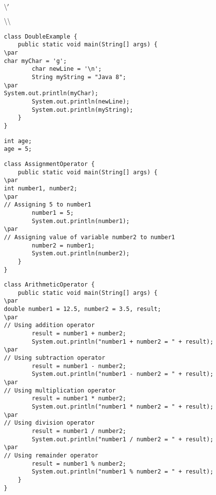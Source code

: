 \documentclass{book}
\def\lthtmlcheckvsize{\ifdim\ht\sizebox<\vsize 
  \ifdim\wd\sizebox<\hsize\expandafter\hfill\fi \expandafter\vfill
  \else\expandafter\vss\fi}%
\begin{document}
{\newpage\clearpage
{}%
$\symbol{92}'$%
\lthtmlindisplaymathZ
\lthtmlcheckvsize\clearpage}

{\newpage\clearpage
{}%
$\symbol{92}\symbol{92}$%
\lthtmlindisplaymathZ
\lthtmlcheckvsize\clearpage}

{\newpage\clearpage
{}%
\begin{lstlisting}
class DoubleExample {
    public static void main(String[] args) {
\par
char myChar = 'g';
        char newLine = '\n';
        String myString = "Java 8";
\par
System.out.println(myChar);
        System.out.println(newLine);
        System.out.println(myString);
    }
}
\end{lstlisting}%
\lthtmlfigureZ
\lthtmlcheckvsize\clearpage}

{\newpage\clearpage
{}%
\begin{lstlisting}
int age;
age = 5;
\end{lstlisting}%
\lthtmlfigureZ
\lthtmlcheckvsize\clearpage}

{\newpage\clearpage
{}%
\begin{lstlisting}
class AssignmentOperator {
    public static void main(String[] args) {
\par
int number1, number2;
\par
// Assigning 5 to number1 
        number1 = 5;
        System.out.println(number1);
\par
// Assigning value of variable number2 to number1
        number2 = number1;
        System.out.println(number2);
    }
}
\end{lstlisting}%
\lthtmlfigureZ
\lthtmlcheckvsize\clearpage}

{\newpage\clearpage
{}%
\begin{lstlisting}
class ArithmeticOperator {
    public static void main(String[] args) {
\par
double number1 = 12.5, number2 = 3.5, result;
\par
// Using addition operator
        result = number1 + number2;
        System.out.println("number1 + number2 = " + result);
\par
// Using subtraction operator
        result = number1 - number2;
        System.out.println("number1 - number2 = " + result);
\par
// Using multiplication operator
        result = number1 * number2;
        System.out.println("number1 * number2 = " + result);
\par
// Using division operator
        result = number1 / number2;
        System.out.println("number1 / number2 = " + result);
\par
// Using remainder operator
        result = number1 % number2;
        System.out.println("number1 % number2 = " + result);
    }
}
\end{lstlisting}%
\lthtmlfigureZ
\lthtmlcheckvsize\clearpage}
\end{document}
